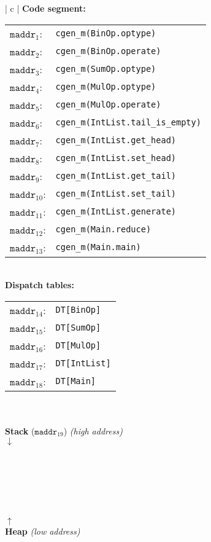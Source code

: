 \documentclass[11pt]{article}
\begin{document}
\begin{enumerate}
\begin{tabular}{ | c | }
\hline 
\textbf{Code segment:} \\ 
\begin{tabular}{ | R{2cm} | L{9cm} |}
\hline
$\mathtt{maddr}_1$: & \texttt{cgen\_m(BinOp.optype)} \\
$\mathtt{maddr}_2$: & \texttt{cgen\_m(BinOp.operate)} \\
$\mathtt{maddr}_3$: & \texttt{cgen\_m(SumOp.optype)} \\
$\mathtt{maddr}_4$: & \texttt{cgen\_m(MulOp.optype)} \\
$\mathtt{maddr}_5$: & \texttt{cgen\_m(MulOp.operate)} \\
$\mathtt{maddr}_6$: & \texttt{cgen\_m(IntList.tail\_is\_empty)} \\
$\mathtt{maddr}_7$: & \texttt{cgen\_m(IntList.get\_head)} \\
$\mathtt{maddr}_8$: & \texttt{cgen\_m(IntList.set\_head)} \\
$\mathtt{maddr}_9$: & \texttt{cgen\_m(IntList.get\_tail)} \\
$\mathtt{maddr}_{10}$: & \texttt{cgen\_m(IntList.set\_tail)} \\
$\mathtt{maddr}_{11}$: & \texttt{cgen\_m(IntList.generate)} \\
$\mathtt{maddr}_{12}$: & \texttt{cgen\_m(Main.reduce)} \\
$\mathtt{maddr}_{13}$: & \texttt{cgen\_m(Main.main)} \\
\hline
\end{tabular} \\
\textbf{Dispatch tables:} \\
\begin{tabular}{ | R{2cm} | L{9cm} |}
\hline
$\mathtt{maddr}_{14}$: & \texttt{DT[BinOp]} \\
$\mathtt{maddr}_{15}$: & \texttt{DT[SumOp]} \\
$\mathtt{maddr}_{16}$: & \texttt{DT[MulOp]} \\
$\mathtt{maddr}_{17}$: & \texttt{DT[IntList]} \\
$\mathtt{maddr}_{18}$: & \texttt{DT[Main]} \\
\hline
\end{tabular} \\
\\ \hline 
\textbf{Stack} ($\mathtt{maddr}_{19}$) \textit{(high address)} \\
$\downarrow$ \\
\\
\\
\\
\hline
\\
\\
\\
$\uparrow$ \\
\textbf{Heap} \textit{(low address)} \\
\hline 
\end{tabular}


\end{enumerate}
\end{document}
